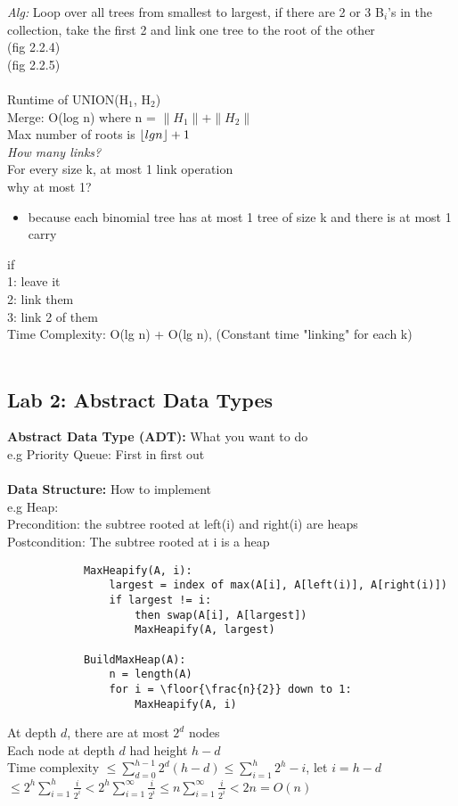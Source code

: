 \documentclass{article}
\DeclarePairedDelimiter\floor{\lfloor}{\rfloor}
\begin{document}
		\emph{Alg:} Loop over all trees from smallest to largest, if there are 2 or 3 B$_i$'s in the collection, take the first 2 and link one tree to the root of the other\\
		(fig 2.2.4)\\
		(fig 2.2.5)\\\\
		Runtime of UNION(H$_1$, H$_2$)\\
		Merge: O(log n) where n = $\|H_1\| + \|H_2\|$\\
		Max number of roots is $\floor{lg n} + 1$\\
		\emph{How many links?}\\
		For every size k, at most 1 link operation\\
		why at most 1?
		\begin{itemize}
			\item because each binomial tree has at most 1 tree of size k and there is at most 1 carry
		\end{itemize}
		if\\ 
		1: leave it\\
		2: link them\\
		3: link 2 of them\\
		Time Complexity: O(lg n) + O(lg n), (Constant time "linking" for each k)\\\\
		
		\subsection{Lab 2: Abstract Data Types}
		\textbf{Abstract Data Type (ADT):} What you want to do\\
		e.g Priority Queue: First in first out\\\\
		\textbf{Data Structure:} How to implement\\
		e.g Heap:\\
		Precondition: the subtree rooted at left(i) and right(i) are heaps\\
		Postcondition: The subtree rooted at i is a heap
		\begin{lstlisting}
			MaxHeapify(A, i):
				largest = index of max(A[i], A[left(i)], A[right(i)])
				if largest != i:
					then swap(A[i], A[largest])
					MaxHeapify(A, largest)
					
			BuildMaxHeap(A):
				n = length(A)
				for i = \floor{\frac{n}{2}} down to 1:
					MaxHeapify(A, i)
		\end{lstlisting}
		At depth $d$, there are at most $2^d$ nodes\\
		Each node at depth $d$ had height $h-d$\\
		Time complexity $\le \sum_{d=0}^{h-1}2^d(h-d)\le \sum_{i=1}^{h} 2^h-i$, let $i=h-d$\\
		$\le 2^h\sum_{i=1}^{h}\frac{i}{2^i} < 2^h\sum_{i=1}^{\infty}\frac{i}{2^i} \le n\sum_{i=1}^{\infty}\frac{i}{2^i} < 2n = O(n)$	\\\\	
	
\end{document}
